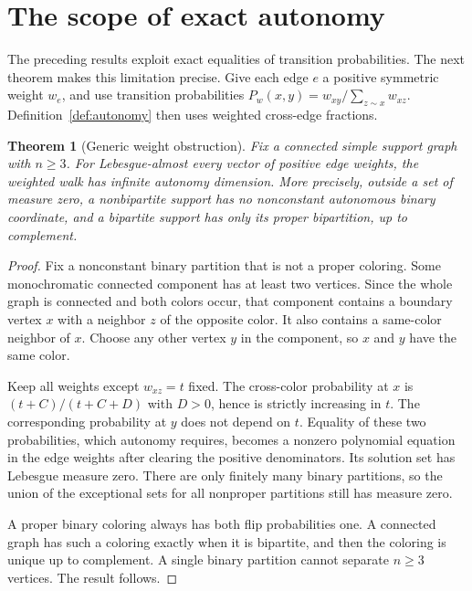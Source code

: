 \documentclass[11pt]{article}
\newtheorem{theorem}{Theorem}[section]
\theoremstyle{definition}
\numberwithin{equation}{section}
\begin{document}
\section{The scope of exact autonomy}

The preceding results exploit exact equalities of transition probabilities.
The next theorem makes this limitation precise. Give each edge $e$ a
positive symmetric weight $w_e$, and use transition probabilities
$P_w(x,y)=w_{xy}/\sum_{z\sim x}w_{xz}$. Definition~\ref{def:autonomy}
then uses weighted cross-edge fractions.

\begin{theorem}[Generic weight obstruction]\label{thm:weights}
Fix a connected simple support graph with $n\geq3$. For Lebesgue-almost
every vector of positive edge weights, the weighted walk has infinite
autonomy dimension. More precisely, outside a set of measure zero, a
nonbipartite support has no nonconstant autonomous binary coordinate,
and a bipartite support has only its proper bipartition, up to complement.
\end{theorem}

\begin{proof}
Fix a nonconstant binary partition that is not a proper coloring. Some
monochromatic connected component has at least two vertices. Since the
whole graph is connected and both colors occur, that component contains
a boundary vertex $x$ with a neighbor $z$ of the opposite color. It also
contains a same-color neighbor of $x$. Choose any other vertex $y$ in the
component, so $x$ and $y$ have the same color.

Keep all weights except $w_{xz}=t$ fixed. The cross-color probability at
$x$ is $(t+C)/(t+C+D)$ with $D>0$, hence is strictly increasing in $t$.
The corresponding probability at $y$ does not depend on $t$. Equality of
these two probabilities, which autonomy requires, becomes a nonzero
polynomial equation in the edge weights after clearing the positive
denominators. Its solution set has Lebesgue measure zero. There are only
finitely many binary partitions, so the union of the exceptional sets
for all nonproper partitions still has measure zero.

A proper binary coloring always has both flip probabilities one.
A connected graph has such a coloring exactly when it is bipartite,
and then the coloring is unique up to complement. A single binary
partition cannot separate $n\geq3$ vertices. The result follows.
\end{proof}
\end{document}
